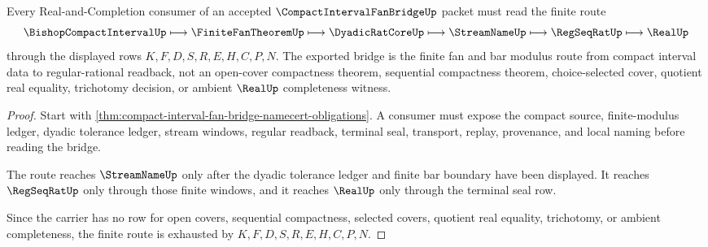 \begin{theorem}
\label{thm:compact-interval-fan-bridge-finite-route}
Every Real-and-Completion consumer of an accepted $\CompactIntervalFanBridgeUp$ packet must read the finite route
$$
\BishopCompactIntervalUp \longmapsto \FiniteFanTheoremUp \longmapsto \DyadicRatCoreUp \longmapsto \StreamNameUp \longmapsto \RegSeqRatUp \longmapsto \RealUp
$$
through the displayed rows $K,F,D,S,R,E,H,C,P,N$. The exported bridge is the finite fan and bar modulus route from compact interval data to regular-rational readback, not an open-cover compactness theorem, sequential compactness theorem, choice-selected cover, quotient real equality, trichotomy decision, or ambient $\RealUp$ completeness witness.
\end{theorem}
\begin{proof}
Start with \autoref{thm:compact-interval-fan-bridge-namecert-obligations}. A consumer must expose the compact source, finite-modulus ledger, dyadic tolerance ledger, stream windows, regular readback, terminal seal, transport, replay, provenance, and local naming before reading the bridge.

The route reaches $\StreamNameUp$ only after the dyadic tolerance ledger and finite bar boundary have been displayed. It reaches $\RegSeqRatUp$ only through those finite windows, and it reaches $\RealUp$ only through the terminal seal row.

Since the carrier has no row for open covers, sequential compactness, selected covers, quotient real equality, trichotomy, or ambient completeness, the finite route is exhausted by $K,F,D,S,R,E,H,C,P,N$.
\end{proof}




